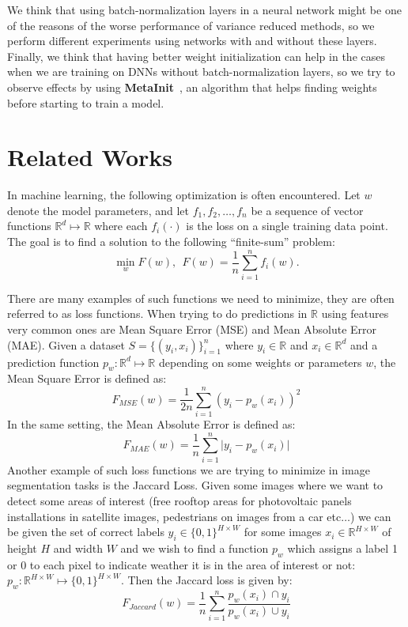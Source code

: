 \documentclass[a4paper,11pt,oneside]{report}
\begin{document}
We think that using batch-normalization layers in a neural network might be one of the reasons of the worse performance of variance reduced methods, so we perform different experiments using networks with and without these layers. Finally, we think that having better weight initialization can help in the cases when we are training on DNNs without batch-normalization layers, so we try to observe effects by using \textbf{MetaInit}~\cite{NEURIPS2019_876e8108}, an algorithm that helps finding weights before starting to train a model.


\chapter{Related Works}

In machine learning, the following optimization is often encountered.
Let $w$ denote the model parameters, and let $f_1, f_2, \dots, f_n$ be a sequence of vector functions $\mathbb{R}^d \mapsto \mathbb{R}$ where each $f_i(\cdot)$ is the loss on a single training data point.
The goal is to find a solution to the following ``finite-sum'' problem:
\begin{equation}\label{eq:minimzing_function}
    \min_w F(w),~~F(w)=\frac{1}{n}\sum_{i=1}^n f_i(w).
\end{equation}

There are many examples of such functions we need to minimize, they are often referred to as loss functions. When trying to do predictions in $\mathbb{R}$ using features very common ones are Mean Square Error (MSE) and Mean Absolute Error (MAE). Given a dataset $S=\{(y_i, x_i)\}_{i=1}^n$ where $y_i \in \mathbb{R}$ and $x_i \in \mathbb{R}^d$ and a prediction function $p_w : \mathbb{R}^d \mapsto \mathbb{R}$ depending on some weights or parameters $w$, the Mean Square Error is defined as:
$$F_{MSE}(w) = \frac{1}{2n}\sum_{i=1}^n(y_i - p_w(x_i))^2$$
In the same setting, the Mean Absolute Error is defined as:
$$F_{MAE}(w) = \frac{1}{n}\sum_{i=1}^n\mathopen|y_i - p_w(x_i)\mathclose|$$
Another example of such loss functions we are trying to minimize in image segmentation tasks is the Jaccard Loss. Given some images where we want to detect some areas of interest (free rooftop areas for photovoltaic panels installations in satellite images, pedestrians on images from a car etc$\dots$) we can be given the set of correct labels $y_i \in \{0,1\}^{H \times W}$ for some images $x_i \in \mathbb{R}^{H \times W}$ of height $H$ and width $W$ and we wish to find a function $p_w$ which assigns a label 1 or 0 to each pixel to indicate weather it is in the area of interest or not: $p_w : \mathbb{R}^{H \times W} \mapsto \{0,1\}^{H \times W}$. Then the Jaccard loss is given by:
$$F_{Jaccard}(w) = \frac{1}{n}\sum_{i=1}^n \frac{p_w(x_i) \cap y_i}{p_w(x_i) \cup y_i}$$
\end{document}
